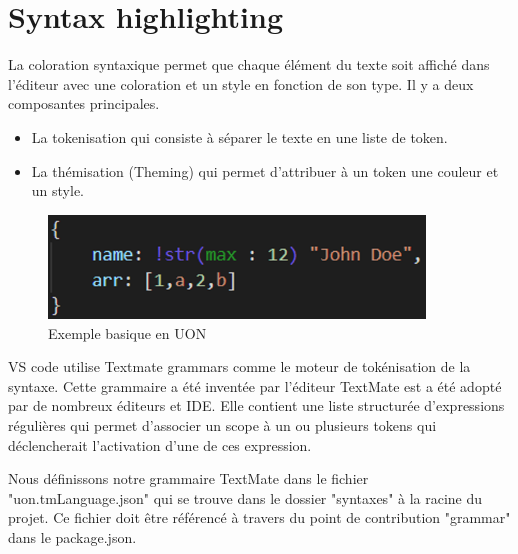 \documentclass[
    iict, %
    il, %
]{heig-tb}
\begin{document}
\section{Syntax highlighting}

La coloration syntaxique permet que chaque élément du texte soit affiché dans l'éditeur avec une coloration et un style en fonction de son type.
Il y a deux composantes principales.
\begin{itemize}
    \item La tokenisation qui consiste à séparer le texte en une liste de token.
    \item La thémisation (Theming) qui permet d'attribuer à un token une couleur et un style.
\end{itemize}

\begin{figure}[!h]
    \begin{center}
        \includegraphics[width=10cm]{assets/figures/basic-uon.png}
    \end{center}
    \caption[code UON]{\label{basic-uon} Exemple basique en UON}
\end{figure}


VS code utilise Textmate grammars \cite{textmate-grammars} comme le moteur de tokénisation de la syntaxe.
Cette grammaire a été inventée par l'éditeur TextMate est a été adopté par de nombreux éditeurs et IDE.
Elle contient une liste structurée d'expressions régulières qui permet d'associer un scope
à un ou plusieurs tokens qui déclencherait l'activation d'une de ces expression.


Nous définissons notre grammaire TextMate dans le fichier "uon.tmLanguage.json" qui se trouve dans le dossier "syntaxes" à la racine du projet.
Ce fichier doit être référencé à travers du point de contribution "grammar" dans le package.json.

\end{document}
